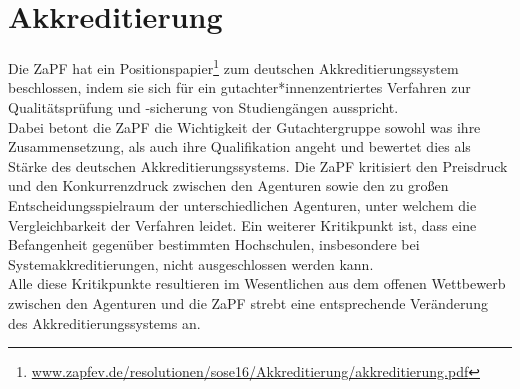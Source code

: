 \section*{Akkreditierung}
Die ZaPF hat ein 
Positionspapier\footnote{\href{http://www.zapfev.de/resolutionen/sose16/Akkreditierung/akkreditierung.pdf}{\url{www.zapfev.de/resolutionen/sose16/Akkreditierung/akkreditierung.pdf}}}
 zum deutschen Akkreditierungssystem beschlossen, indem sie sich für ein 
gutachter*innenzentriertes Verfahren zur Qualitätsprüfung und -sicherung von 
Studiengängen ausspricht.\\
Dabei betont die ZaPF die Wichtigkeit der Gutachtergruppe sowohl was ihre 
Zusammensetzung, als auch ihre Qualifikation angeht und bewertet dies als 
Stärke des deutschen Akkreditierungssystems. Die ZaPF kritisiert den Preisdruck 
und den Konkurrenzdruck zwischen den Agenturen sowie den zu großen 
Entscheidungsspielraum der unterschiedlichen Agenturen, unter welchem die 
Vergleichbarkeit der Verfahren leidet. Ein weiterer Kritikpunkt ist, dass eine 
Befangenheit gegenüber bestimmten Hochschulen, insbesondere bei 
Systemakkreditierungen, nicht ausgeschlossen werden kann.\\
Alle diese Kritikpunkte resultieren im Wesentlichen aus dem offenen 
Wettbewerb zwischen den Agenturen und die ZaPF strebt eine entsprechende 
Veränderung des Akkreditierungssystems an.

